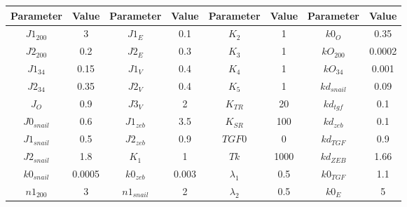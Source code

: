 \documentclass{article}
\begin{document}
\begin{table}
	\centering{}{\footnotesize{} }%
	\begin{tabular}{|c|c|c|c|c|c|c|c|}
		\hline
		{\footnotesize{}Parameter } & {\footnotesize{}Value } & {\footnotesize{}Parameter } & {\footnotesize{}Value } & {\footnotesize{}Parameter } & {\footnotesize{}Value } & {\footnotesize{}Parameter } & {\footnotesize{}Value}\tabularnewline
		\hline
		\hline
		{\footnotesize{}$J1_{200}$ } & {\footnotesize{}3 } & {\footnotesize{}$J1_{E}$ } & {\footnotesize{}0.1 } & {\footnotesize{}$K_{2}$ } & {\footnotesize{}1 } & {\footnotesize{}$k0_{O}$ } & {\footnotesize{}0.35}\tabularnewline
		\hline
		{\footnotesize{}$J2_{200}$ } & {\footnotesize{}0.2 } & {\footnotesize{}$J2_{E}$ } & {\footnotesize{}0.3 } & {\footnotesize{}$K_{3}$ } & {\footnotesize{}1 } & {\footnotesize{}$kO_{200}$ } & {\footnotesize{}0.0002}\tabularnewline
		\hline
		{\footnotesize{}$J1_{34}$ } & {\footnotesize{}0.15 } & {\footnotesize{}$J1_{V}$ } & {\footnotesize{}0.4 } & {\footnotesize{}$K_{4}$ } & {\footnotesize{}1 } & {\footnotesize{}$kO_{34}$ } & {\footnotesize{}0.001}\tabularnewline
		\hline
		{\footnotesize{}$J2_{34}$ } & {\footnotesize{}0.35 } & {\footnotesize{}$J2_{V}$ } & {\footnotesize{}0.4 } & {\footnotesize{}$K_{5}$ } & {\footnotesize{}1 } & {\footnotesize{}$kd_{snail}$ } & {\footnotesize{}0.09}\tabularnewline
		\hline
		{\footnotesize{}$J_{O}$ } & {\footnotesize{}0.9 } & {\footnotesize{}$J3_{V}$ } & {\footnotesize{}2 } & {\footnotesize{}$K_{TR}$ } & {\footnotesize{}20 } & {\footnotesize{}$kd_{tgf}$ } & {\footnotesize{}0.1}\tabularnewline
		\hline
		{\footnotesize{}$J0_{snail}$ } & {\footnotesize{}0.6 } & {\footnotesize{}$J1_{zeb}$ } & {\footnotesize{}3.5 } & {\footnotesize{}$K_{SR}$ } & {\footnotesize{}100 } & {\footnotesize{}$kd_{zeb}$ } & {\footnotesize{}0.1}\tabularnewline
		\hline
		{\footnotesize{}$J1_{snail}$ } & {\footnotesize{}0.5 } & {\footnotesize{}$J2_{zeb}$ } & {\footnotesize{}0.9 } & {\footnotesize{}$TGF0$ } & {\footnotesize{}0 } & {\footnotesize{}$kd_{TGF}$ } & {\footnotesize{}0.9}\tabularnewline
		\hline
		{\footnotesize{}$J2_{snail}$ } & {\footnotesize{}1.8 } & {\footnotesize{}$K_{1}$ } & {\footnotesize{}1 } & {\footnotesize{}$Tk$ } & {\footnotesize{}1000 } & {\footnotesize{}$kd_{ZEB}$ } & {\footnotesize{}1.66}\tabularnewline
		\hline
		{\footnotesize{}$k0_{snail}$ } & {\footnotesize{}0.0005 } & {\footnotesize{}$k0_{zeb}$ } & {\footnotesize{}0.003 } & {\footnotesize{}$\lambda_{1}$ } & {\footnotesize{}0.5 } & {\footnotesize{}$k0_{TGF}$ } & {\footnotesize{}1.1}\tabularnewline
		\hline
		{\footnotesize{}$n1_{200}$ } & {\footnotesize{}3 } & {\footnotesize{}$n1_{snail}$ } & {\footnotesize{}2 } & {\footnotesize{}$\lambda_{2}$ } & {\footnotesize{}0.5 } & {\footnotesize{}$k0_{E}$ } & {\footnotesize{}5}\tabularnewline

\end{tabular}
\end{table}
\end{document}
